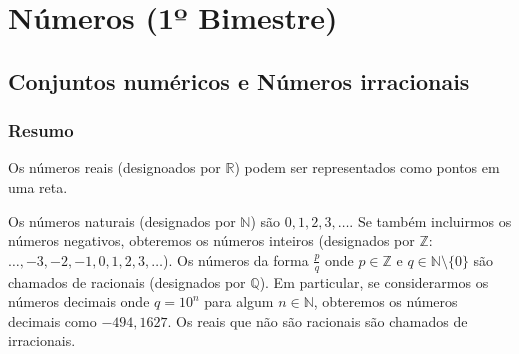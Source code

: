 \chapter{Números (1º Bimestre)}

\section{Conjuntos numéricos e Números irracionais}

\subsection*{Resumo}

Os números reais (designoados por $\mathbb R$) podem ser representados como
pontos em uma reta.

\begin{center}
\end{center}

Os números naturais (designados por $\mathbb N$) são $0, 1, 2, 3, \ldots$. Se
também incluirmos os números negativos, obteremos os números inteiros
(designados por $\mathbb Z$: $\ldots, -3, -2, -1, 0, 1, 2, 3, \ldots$).
Os números da forma $\frac{p}{q}$ onde $p \in \mathbb Z$ e $q \in \mathbb N
\setminus \{0\}$ são chamados de racionais (designados por $\mathbb Q$). Em
particular, se considerarmos os números decimais onde $q = 10^n$ para algum $n
\in \mathbb N$, obteremos os números decimais como $-494,1627$.
Os reais que não são racionais são chamados de irracionais.

\begin{center}
\end{center}

